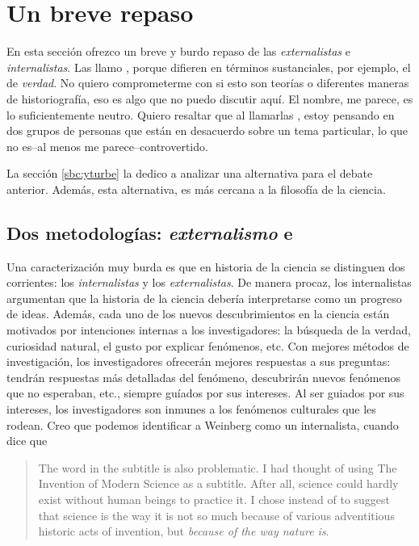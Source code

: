 \section{Un breve repaso}

En esta sección ofrezco un breve y burdo repaso de las  \emph{externalistas} e \emph{internalistas}.
Las llamo , porque difieren en términos sustanciales, por ejemplo, el de \emph{verdad}.
No quiero comprometerme con si esto son teorías o diferentes maneras de historiografía, eso es algo que no puedo discutir aquí.
El nombre, me parece, es lo suficientemente neutro.
Quiero resaltar que al llamarlas , estoy pensando en dos grupos de personas que están en desacuerdo sobre un tema particular, lo que no es--al menos me parece--controvertido.

La sección \ref{sbc:yturbe} la dedico a analizar una alternativa para el debate anterior.
Además, esta alternativa, es más cercana a la filosofía de la ciencia.

\subsection{Dos metodologías: \emph{externalismo} e }


\noindent Una caracterización muy burda es que en historia de la ciencia se distinguen dos corrientes: los \emph{internalistas} y los \emph{externalistas}.
De manera procaz, los internalistas argumentan que la historia de la ciencia debería interpretarse como un progreso de ideas.
Además, cada uno de los nuevos descubrimientos en la ciencia están motivados por intenciones internas a los investigadores: la búsqueda de la verdad, curiosidad natural, el gusto por explicar fenómenos, etc.
Con mejores métodos de investigación, los investigadores ofrecerán mejores respuestas a sus preguntas: tendrán respuestas más detalladas del fenómeno, descubrirán nuevos fenómenos que no esperaban, etc., siempre guíados por sus intereses.
Al ser guiados por sus intereses, los investigadores son inmunes a los fenómenos culturales que les rodean.
Creo que podemos identificar a Weinberg como un internalista, cuando dice que

\begin{quote}
	The word  in the subtitle is also problematic.
	I had thought of using The Invention of Modern Science as a subtitle.
	After all, science could hardly exist without human beings to practice it.
	I chose  instead of  to suggest that science is the way it is not so much because of various adventitious historic acts of invention, but \emph{because of the way nature is}. \parencite[Énfasis agregado][Prefacio]{Weinberg2015}
\end{quote}

